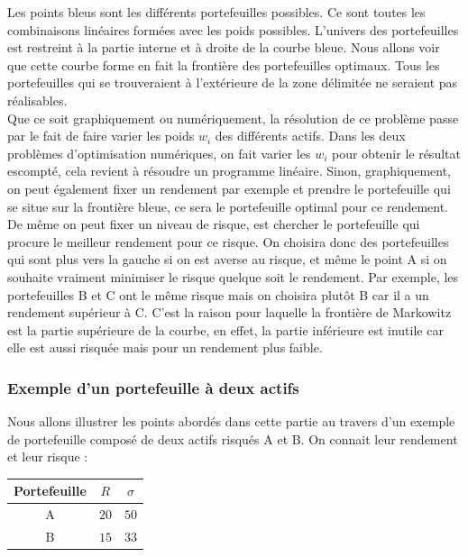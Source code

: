 Les points bleus sont les différents portefeuilles possibles. Ce sont toutes les combinaisons linéaires formées avec les poids possibles. L'univers des portefeuilles est restreint à la partie interne et à droite de la courbe bleue. Nous allons voir que cette courbe forme en fait la frontière des portefeuilles optimaux. Tous les portefeuilles qui se trouveraient à l'extérieure de la zone délimitée ne seraient pas réalisables.\\

Que ce soit graphiquement ou numériquement, la résolution de ce problème passe par le fait de faire varier les poids $w_i$ des différents actifs. Dans les deux problèmes d'optimisation numériques, on fait varier les $w_i$ pour obtenir le résultat escompté, cela revient à résoudre un programme linéaire.
Sinon, graphiquement, on peut également fixer un rendement par exemple et prendre le portefeuille qui se situe sur la frontière bleue, ce sera le portefeuille optimal pour ce rendement.\\

De même on peut fixer un niveau de risque, est chercher le portefeuille qui procure le meilleur rendement pour ce risque. On choisira donc des portefeuilles qui sont plus vers la gauche si on est averse au risque, et même le point A si on souhaite vraiment minimiser le risque quelque soit le rendement.
Par exemple, les portefeuilles B et C ont le même risque mais on choisira plutôt B car il a un rendement supérieur à C. C'est la raison pour laquelle la frontière de Markowitz est la partie supérieure de la courbe, en effet, la partie inférieure est inutile car elle est aussi risquée mais pour un rendement plus faible.



\subsubsection{Exemple d'un portefeuille à deux actifs}
Nous allons illustrer les points abordés dans cette partie au travers d'un exemple de portefeuille composé de deux actifs risqués A et B. On connait leur rendement et leur risque :
\begin{center}
  \begin{tabular}{|c|c|c|}
    \hline
    Portefeuille & $R$ & $\sigma$ \\  \hline
    A	& $20$ & $50$ \\   \hline
    B	& $15$ & $33$ \\
    \hline
  \end{tabular}
\end{center}







